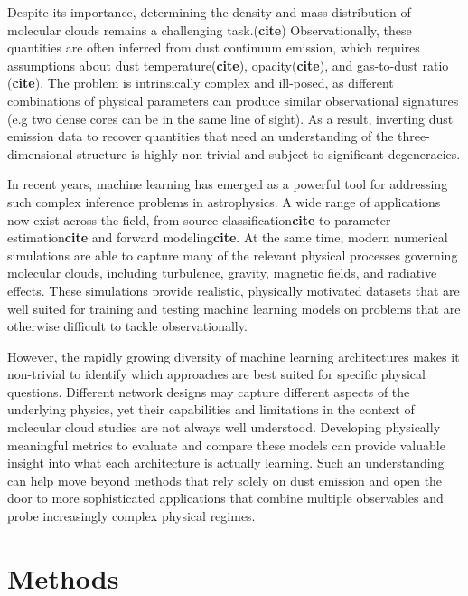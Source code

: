 \documentclass{aa}
\begin{document}
   Despite its importance, determining the density and mass distribution of molecular clouds remains a challenging task.(\textbf{cite})
   Observationally, these quantities are often inferred from dust continuum emission, which requires assumptions about dust temperature(\textbf{cite}), opacity(\textbf{cite}), and gas-to-dust ratio (\textbf{cite}).
   The problem is intrinsically complex and ill-posed, as different combinations of physical parameters can produce similar observational signatures (e.g two dense cores can be in the same line of sight).
   As a result, inverting dust emission data to recover quantities that need an understanding of the three-dimensional structure is highly non-trivial and subject to significant degeneracies.


   In recent years, machine learning has emerged as a powerful tool for addressing such complex inference problems in astrophysics.
   A wide range of applications now exist across the field, from source classification\textbf{cite} to parameter estimation\textbf{cite} and forward modeling\textbf{cite}.
   At the same time, modern numerical simulations are able to capture many of the relevant physical processes governing molecular clouds, including turbulence, gravity, magnetic fields, and radiative effects.
   These simulations provide realistic, physically motivated datasets that are well suited for training and testing machine learning models on problems that are otherwise difficult to tackle observationally.


   However, the rapidly growing diversity of machine learning architectures makes it non-trivial to identify which approaches are best suited for specific physical questions.
   Different network designs may capture different aspects of the underlying physics, yet their capabilities and limitations in the context of molecular cloud studies are not always well understood.
   Developing physically meaningful metrics to evaluate and compare these models can provide valuable insight into what each architecture is actually learning.
   Such an understanding can help move beyond methods that rely solely on dust emission and open the door to more sophisticated applications that combine multiple observables and probe increasingly complex physical regimes.



\section{Methods}
\end{document}
